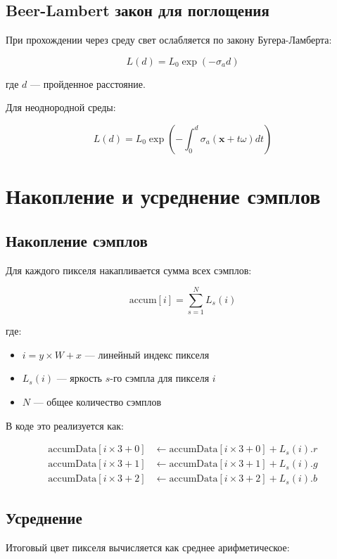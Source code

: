 \documentclass[14pt, a4paper]{extarticle}
\begin{document}
\subsection{Beer-Lambert закон для поглощения}

При прохождении через среду свет ослабляется по закону Бугера-Ламберта:

\[
L(d) = L_0 \exp(-\sigma_a d)
\]

где $d$ --- пройденное расстояние.

Для неоднородной среды:

\[
L(d) = L_0 \exp\left(-\int_0^d \sigma_a(\mathbf{x} + t\omega) dt\right)
\]

\section{Накопление и усреднение сэмплов}

\subsection{Накопление сэмплов}

Для каждого пикселя накапливается сумма всех сэмплов:

\[
\text{accum}[i] = \sum_{s=1}^{N} L_s(i)
\]

где:
\begin{itemize}
    \item $i = y \times W + x$ --- линейный индекс пикселя
    \item $L_s(i)$ --- яркость $s$-го сэмпла для пикселя $i$
    \item $N$ --- общее количество сэмплов
\end{itemize}

В коде это реализуется как:

\begin{align}
\text{accumData}[i \times 3 + 0] &\leftarrow \text{accumData}[i \times 3 + 0] + L_s(i).r \\
\text{accumData}[i \times 3 + 1] &\leftarrow \text{accumData}[i \times 3 + 1] + L_s(i).g \\
\text{accumData}[i \times 3 + 2] &\leftarrow \text{accumData}[i \times 3 + 2] + L_s(i).b
\end{align}

\subsection{Усреднение}

Итоговый цвет пикселя вычисляется как среднее арифметическое:
\end{document}
